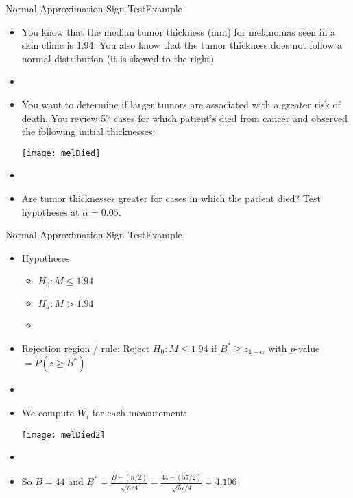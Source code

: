 \documentclass[xcolor=dvipsnames]{beamer}
\begin{document}
\begin{frame}{Normal Approximation Sign Test}{Example}
	\begin{itemize}
		\item You know that the median tumor thickness (mm) for melanomas seen in a skin clinic is 1.94. You also know that the tumor thickness does not follow a normal distribution (it is skewed to the right) \pause
		\item[]
		\item You want to determine if larger tumors are associated with a greater risk of death. You review 57 cases for which patient's died from cancer and observed the following initial thicknesses:
		\begin{center}
			\texttt{[image: melDied]}
		\end{center} \pause
	\item[]
		\item Are tumor thicknesses greater for cases in which the patient died? Test hypotheses at $\alpha = 0.05$.
	\end{itemize}
\end{frame}

\begin{frame}{Normal Approximation Sign Test}{Example}
	\begin{itemize}
		\item Hypotheses: \pause
		\begin{itemize}
			\item $H_0: M \leq 1.94$ \pause
			\item $H_a: M > 1.94$ \pause
			\item[]
		\end{itemize}
		\item Rejection region / rule: Reject $H_0: M \leq 1.94$ if $B^* \geq z_{1-\alpha}$ with $p$-value $=P(z \geq B^*)$ \pause
		\item[]
		\item We compute $W_i$ for each measurement: 
		\begin{center}
			\texttt{[image: melDied2]}
		\end{center} \pause
		\item[]
		\item So $B = 44$ and $B^* = \frac{B-(n/2)}{\sqrt{n/4}} = \frac{44-(57/2)}{\sqrt{57/4}} = 4.106$
	\end{itemize}
\end{frame}
\end{document}
